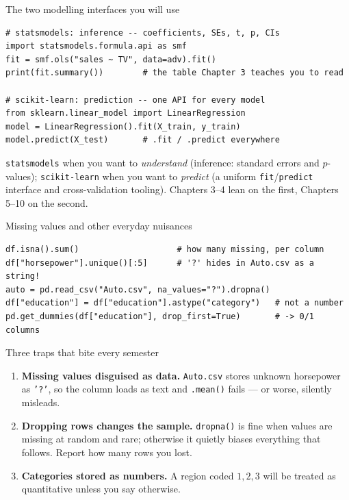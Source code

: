 \documentclass[aspectratio=169,11pt]{beamer}
\begin{document}
\begin{frame}[fragile]{The two modelling interfaces you will use}
\begin{lstlisting}
# statsmodels: inference -- coefficients, SEs, t, p, CIs
import statsmodels.formula.api as smf
fit = smf.ols("sales ~ TV", data=adv).fit()
print(fit.summary())        # the table Chapter 3 teaches you to read

# scikit-learn: prediction -- one API for every model
from sklearn.linear_model import LinearRegression
model = LinearRegression().fit(X_train, y_train)
model.predict(X_test)       # .fit / .predict everywhere
\end{lstlisting}
  \begin{takeaway}
    \texttt{statsmodels} when you want to \emph{understand} (inference:
    standard errors and $p$-values); \texttt{scikit-learn} when you want to
    \emph{predict} (a uniform \texttt{fit}/\texttt{predict} interface and
    cross-validation tooling). Chapters 3--4 lean on the first,
    Chapters 5--10 on the second.
  \end{takeaway}
\end{frame}

\begin{frame}[fragile]{Missing values and other everyday nuisances}
\begin{lstlisting}
df.isna().sum()                    # how many missing, per column
df["horsepower"].unique()[:5]      # '?' hides in Auto.csv as a string!
auto = pd.read_csv("Auto.csv", na_values="?").dropna()
df["education"] = df["education"].astype("category")   # not a number
pd.get_dummies(df["education"], drop_first=True)       # -> 0/1 columns
\end{lstlisting}
  \begin{alertblock}{Three traps that bite every semester}
    \begin{enumerate}
      \item \textbf{Missing values disguised as data.} \texttt{Auto.csv}
            stores unknown horsepower as \texttt{'?'}, so the column loads as
            text and \texttt{.mean()} fails --- or worse, silently misleads.
      \item \textbf{Dropping rows changes the sample.} \texttt{dropna()} is
            fine when values are missing at random and rare; otherwise it
            quietly biases everything that follows. Report how many rows you
            lost.
      \item \textbf{Categories stored as numbers.} A region coded $1,2,3$ will
            be treated as quantitative unless you say otherwise.
    \end{enumerate}
  \end{alertblock}
\end{frame}
\end{document}
